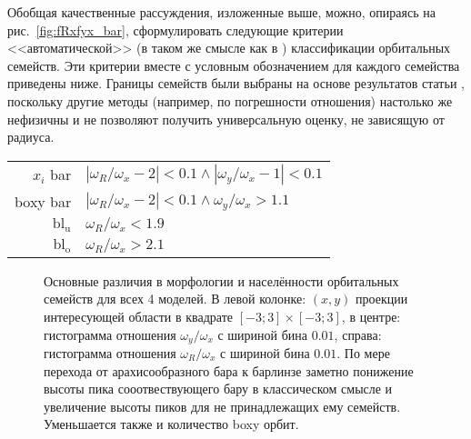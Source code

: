 \documentclass[tikz]{trlnotes}
\begin{document}
Обобщая качественные рассуждения, изложенные выше, можно, опираясь на
рис.~\ref{fig:fRxfyx_bar},  сформулировать следующие критерии <<автоматической>> (в
таком же смысле как в \cite{valluri2016}) классификации орбитальных семейств. Эти критерии вместе с условным обозначением для каждого семейства приведены ниже.
Границы семейств были выбраны на основе результатов статьи \citet{portail2015}, поскольку другие методы (например, по погрешности
отношения) настолько же нефизичны и не позволяют получить универсальную оценку, не зависящую от радиуса.
\begin{table}[hb]
  \begin{tabular}{rl}
    $x_i$ bar & $|ω_R/ω_x - 2| < 0.1 \land |ω_y/ω_x - 1| < 0.1$ \\
    boxy bar  & $|ω_R/ω_x - 2| < 0.1 \land  ω_y/ω_x > 1.1$ \\
    $\text{bl}_\text{u}$  & $ω_R/ω_x < 1.9$ \\
    $\text{bl}_\text{o}$  & $ω_R/ω_x > 2.1$ \\
  \end{tabular}
\end{table}

\begin{figure}[htpb]
\centering
{}  
\caption{Основные различия в морфологии и населённости орбитальных семейств для всех 4 моделей. В левой колонке:
  $(x,y)$ проекции интересующей области в квадрате $[-3;3]\times[-3;3]$, в центре: гистограмма отношения $ω_y/ω_x$
  с шириной бина $0.01$, справа: гистограмма отношения $ω_R/ω_x$ с шириной бина $0.01$. По мере перехода от
  арахисообразного бара к барлинзе заметно понижение высоты пика сооотвествующего бару в классическом
  смысле и увеличение высоты пиков для не принадлежащих ему семейств. Уменьшается также и количество boxy орбит.
}
\label{fig:modelcomp1dist}
\end{figure}
\end{document}
